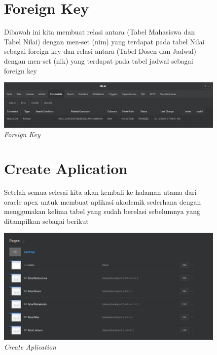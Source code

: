 \begin{enumerate}
\begin{figure}
\section{Foreign Key}
Dibawah ini kita membuat relasi antara (Tabel Mahasiswa dan Tabel Nilai) dengan men-set (nim) yang terdapat pada
tabel Nilai sebagai foreign key dan relasi antara (Tabel Dosen dan Jadwal) dengan men-set (nik) yang terdapat pada
tabel jadwal sebagai foreign key
    \begin{center}
\includegraphics[scale=0.4]{figures/foreignKey.png}
    \caption{\textit{Foreign Key}}
        \end{center}
\label{gambar}
\end{figure}

\begin{figure}
\section{Create Aplication}

Setelah semua selesai kita akan kembali ke halaman utama dari oracle apex untuk membuat aplikasi akademik
sederhana dengan menggunakan kelima tabel yang sudah berelasi sebelumnya
yang ditampilkan sebagai berikut

    \begin{center}
\includegraphics[scale=0.4]{figures/tugasdb3_7.png}
    \caption{\textit{Create Aplication}}
        \end{center}
\label{gambar}
\end{figure}


\end{enumerate}
